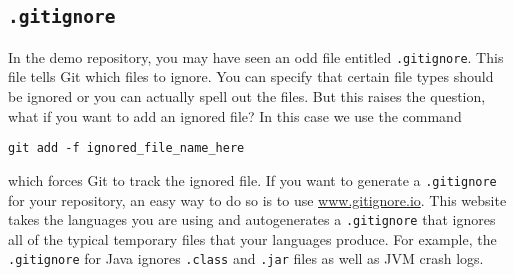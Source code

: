 \documentclass[notitlepage]{simple}
\begin{document}
\subsection{\texttt{.gitignore}}

In the demo repository, you may have seen an odd file entitled \verb|.gitignore|.
This file tells Git which files to ignore.
You can specify that certain file types should be ignored or you can actually spell out the files.
But this raises the question, what if you want to add an ignored file?
In this case we use the command
\begin{terminal}
	\verb|git add -f ignored_file_name_here|
\end{terminal}
which forces Git to track the ignored file.
If you want to generate a \verb|.gitignore| for your repository, an easy way to do so is to use \url{www.gitignore.io}.
This website takes the languages you are using and autogenerates a \verb|.gitignore| that ignores all of the typical temporary files that your languages produce.
For example, the \verb|.gitignore| for Java ignores \verb|.class| and \verb|.jar| files as well as JVM crash logs.
\end{document}
